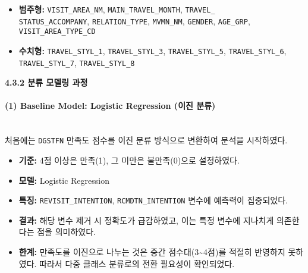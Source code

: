 \documentclass[sigconf]{acmart}
\begin{document}
\begin{CJK}{UTF8}{mj}
\begin{itemize}
  \item \textbf{범주형:} \texttt{VISIT\_AREA\_NM}, \texttt{MAIN\_TRAVEL\_MONTH}, \texttt{TRAVEL\_\\STATUS\_ACCOMPANY}, \texttt{RELATION\_TYPE}, \texttt{MVMN\_NM}, \texttt{GENDER}, \texttt{AGE\_GRP}, \texttt{VISIT\_AREA\_TYPE\_CD}
  \item \textbf{수치형:} \texttt{TRAVEL\_STYL\_1}, \texttt{TRAVEL\_STYL\_3}, \texttt{TRAVEL\_STYL\_5}, \texttt{TRAVEL\_STYL\_6}, \texttt{TRAVEL\_STYL\_7}, \texttt{TRAVEL\_STYL\_8}
\end{itemize}

\vspace{0.5em}
\noindent\textbf{4.3.2 분류 모델링 과정}\par

\paragraph{(1) Baseline Model: Logistic Regression (이진 분류)}\mbox{}\\
처음에는 \texttt{DGSTFN} 만족도 점수를 이진 분류 방식으로 변환하여 분석을 시작하였다.
\begin{itemize}
  \item \textbf{기준:} 4점 이상은 만족(1), 그 미만은 불만족(0)으로 설정하였다.
  \item \textbf{모델:} Logistic Regression
  \item \textbf{특징:} \texttt{REVISIT\_INTENTION}, \texttt{RCMDTN\_INTENTION} 변수에 예측력이 집중되었다.
  \item \textbf{결과:} 해당 변수 제거 시 정확도가 급감하였고, 이는 특정 변수에 지나치게 의존한다는 점을 의미하였다.
  \item \textbf{한계:} 만족도를 이진으로 나누는 것은 중간 점수대(3\textasciitilde{}4점)를 적절히 반영하지 못하였다. 따라서 다중 클래스 분류로의 전환 필요성이 확인되었다.
\end{itemize}


\end{CJK}
\end{document}
